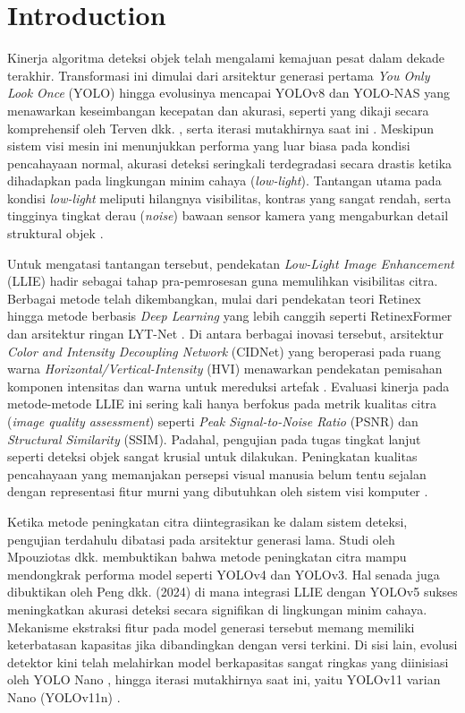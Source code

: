 \documentclass[conference]{IEEEtran}
\begin{document}
\section{Introduction} 
Kinerja algoritma deteksi objek telah mengalami kemajuan pesat dalam dekade terakhir. Transformasi ini dimulai dari arsitektur generasi pertama \textit{You Only Look Once} (YOLO) \cite{redmon2016yolo} hingga evolusinya mencapai YOLOv8 dan YOLO-NAS yang menawarkan keseimbangan kecepatan dan akurasi, seperti yang dikaji secara komprehensif oleh Terven dkk. \cite{terven2023yoloreview}, serta iterasi mutakhirnya saat ini \cite{sapkota2025yoloreview}. Meskipun sistem visi mesin ini menunjukkan performa yang luar biasa pada kondisi pencahayaan normal, akurasi deteksi seringkali terdegradasi secara drastis ketika dihadapkan pada lingkungan minim cahaya (\textit{low-light}). Tantangan utama pada kondisi \textit{low-light} meliputi hilangnya visibilitas, kontras yang sangat rendah, serta tingginya tingkat derau (\textit{noise}) bawaan sensor kamera yang mengaburkan detail struktural objek \cite{goodfellow2016,loh2019exdark,gong2025multiscale}.

Untuk mengatasi tantangan tersebut, pendekatan \textit{Low-Light Image Enhancement} (LLIE) hadir sebagai tahap pra-pemrosesan guna memulihkan visibilitas citra. Berbagai metode telah dikembangkan, mulai dari pendekatan teori Retinex hingga metode berbasis \textit{Deep Learning} yang lebih canggih seperti RetinexFormer \cite{cai2023retinexformer} dan arsitektur ringan LYT-Net \cite{brateanu2025lytnet}. Di antara berbagai inovasi tersebut, arsitektur \textit{Color and Intensity Decoupling Network} (CIDNet) yang beroperasi pada ruang warna \textit{Horizontal/Vertical-Intensity} (HVI) menawarkan pendekatan pemisahan komponen intensitas dan warna untuk mereduksi artefak \cite{yan2025hvi}. Evaluasi kinerja pada metode-metode LLIE ini sering kali hanya berfokus pada metrik kualitas citra (\textit{image quality assessment}) seperti \textit{Peak Signal-to-Noise Ratio} (PSNR) dan \textit{Structural Similarity} (SSIM). Padahal, pengujian pada tugas tingkat lanjut seperti deteksi objek sangat krusial untuk dilakukan. Peningkatan kualitas pencahayaan yang memanjakan persepsi visual manusia belum tentu sejalan dengan representasi fitur murni yang dibutuhkan oleh sistem visi komputer \cite{wu2024llieeffect,liu2021benchmark}.

Ketika metode peningkatan citra diintegrasikan ke dalam sistem deteksi, pengujian terdahulu dibatasi pada arsitektur generasi lama. Studi oleh Mpouziotas dkk. \cite{mpouziotas2022lowlight} membuktikan bahwa metode peningkatan citra mampu mendongkrak performa model seperti YOLOv4 dan YOLOv3. Hal senada juga dibuktikan oleh Peng dkk. (2024) \cite{peng2024yolov5llie} di mana integrasi LLIE dengan YOLOv5 sukses meningkatkan akurasi deteksi secara signifikan di lingkungan minim cahaya. Mekanisme ekstraksi fitur pada model generasi tersebut memang memiliki keterbatasan kapasitas jika dibandingkan dengan versi terkini. Di sisi lain, evolusi detektor kini telah melahirkan model berkapasitas sangat ringkas yang diinisiasi oleh YOLO Nano \cite{wong2019yolonano}, hingga iterasi mutakhirnya saat ini, yaitu YOLOv11 varian Nano (YOLOv11n) \cite{khanam2024yolov11}.
\end{document}
